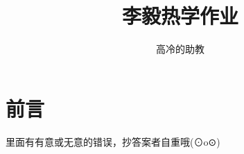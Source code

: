 \documentclass{article}
\title{李毅热学作业}
\author{高冷的助教}
\begin{document}
\newcommand{\HW}{\subsection*{HW}}
\newcommand{\Q}[1]{\subsection*{#1}}	
\newcommand{\q}[1]{\subsubsection*{(#1)}}
	
\maketitle
\section*{前言}
里面有有意或无意的错误，抄答案者自重哦(⊙o⊙)
















\end{document}
